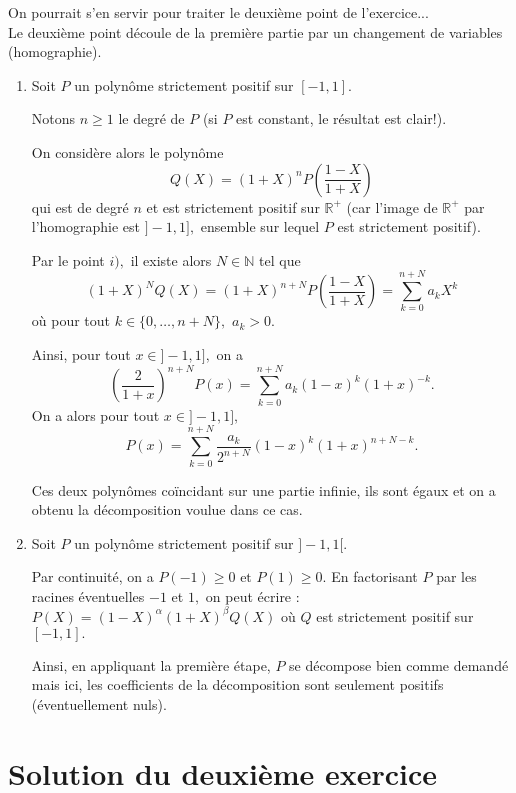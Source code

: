 \begin{enumerate}
On pourrait s'en servir pour traiter le deuxième point de l'exercice...\\

Le deuxième point découle de la première partie par un changement de variables (homographie).

\begin{enumerate}
\item Soit $P$ un polynôme strictement positif sur $[-1,1].$ 

Notons $n\geq 1$ le degré de $P$ (si $P$ est constant, le résultat est clair!).

On considère alors le polynôme $$Q(X)=(1+X)^{n}P\left( \frac{1-X}{1+X} \right)$$ qui est de degré $n$ et est strictement positif sur $\mathbb{R}^{+}$ (car l'image de $\mathbb{R}^{+}$ par l'homographie est $]-1,1],$ ensemble sur lequel $P$ est strictement positif).

Par le point $i),$ il existe alors $N\in\mathbb{N}$ tel que $$(1+X)^{N}Q(X)=(1+X)^{n+N}P\left( \frac{1-X}{1+X} \right)=\sum_{k=0}^{n+N}a_{k}X^{k}$$ où pour tout $k\in\{0,\ldots,n+N\},$ $a_{k}>0.$

Ainsi, pour tout $x\in ]-1,1],$ on a $$\left(\frac{2}{1+x}\right)^{n+N}P(x)=\sum_{k=0}^{n+N}a_{k}(1-x)^{k}(1+x)^{-k}.$$
On a alors pour tout $x\in]-1,1],$ $$P(x)=\sum_{k=0}^{n+N}\frac{a_{k}}{2^{n+N}}(1-x)^{k}(1+x)^{n+N-k}.$$

Ces deux polynômes coïncidant sur une partie infinie, ils sont égaux et on a obtenu la décomposition voulue dans ce cas.

\item Soit $P$ un polynôme strictement positif sur $]-1,1[.$ 

Par continuité, on a $\displaystyle P(-1)\geq 0 \mbox{ et } P(1)\geq 0.$ En factorisant $P$ par les racines éventuelles $-1$ et $1,$ on peut écrire : $\displaystyle P(X)=(1-X)^{\alpha}(1+X)^{\beta}Q(X)$ où $Q$ est strictement positif sur $[-1,1].$ 

Ainsi, en appliquant la première étape, $P$ se décompose bien comme demandé mais ici, les coefficients de la décomposition sont seulement positifs (éventuellement nuls).
\end{enumerate}

\end{enumerate}

\section{Solution du deuxième exercice}

